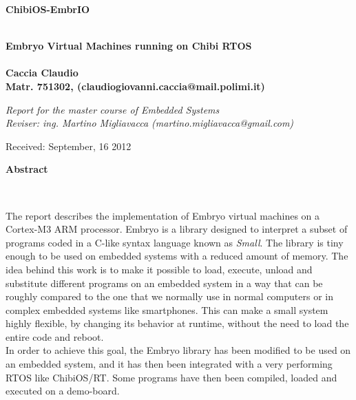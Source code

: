 \documentclass[a4paper,10pt]{article}
\newenvironment*{mytitle}{\begin{LARGE}\bf}{\end{LARGE}\\}%
\newenvironment*{mysubtitle}{\bf}{\\[1.5ex]}%
\newenvironment*{myabstract}{\begin{Large}\bf}{\end{Large}\\[2.5ex]}%
\begin{document}
\begin{mytitle}ChibiOS-EmbrIO\end{mytitle}
\begin{mysubtitle}Embryo Virtual Machines running on Chibi RTOS\end{mysubtitle}
%
%
\\
Caccia Claudio\\
Matr. 751302, (claudiogiovanni.caccia@mail.polimi.it)\\
\hspace{10ex}
\begin{flushright}
\emph{Report for the master course of Embedded Systems}\\
\emph{Reviser: ing. Martino Migliavacca (martino.migliavacca@gmail.com)}
\end{flushright}

Received: September, 16 2012\\
\hspace{10ex}

\begin{myabstract} Abstract \end{myabstract}

The report describes the implementation of Embryo virtual machines on a Cortex-M3 ARM processor. Embryo is a library designed to interpret a subset of programs coded in a C-like syntax language known as \textit{Small}. The library is tiny enough to be used on embedded systems with a reduced amount of memory. The idea behind this work is to make it possible to load, execute, unload and substitute different programs on an embedded system in a way that can be roughly compared to the one that we normally use in normal computers or in complex embedded systems like smartphones. This can make a small system highly flexible, by changing its behavior at runtime, without the need to load the entire code and reboot.\\
In order to achieve this goal, the Embryo library has been modified to be used on an embedded system, and it has then been integrated with a very performing RTOS like ChibiOS/RT. Some programs have then been compiled, loaded and executed on a demo-board.
\end{document}

